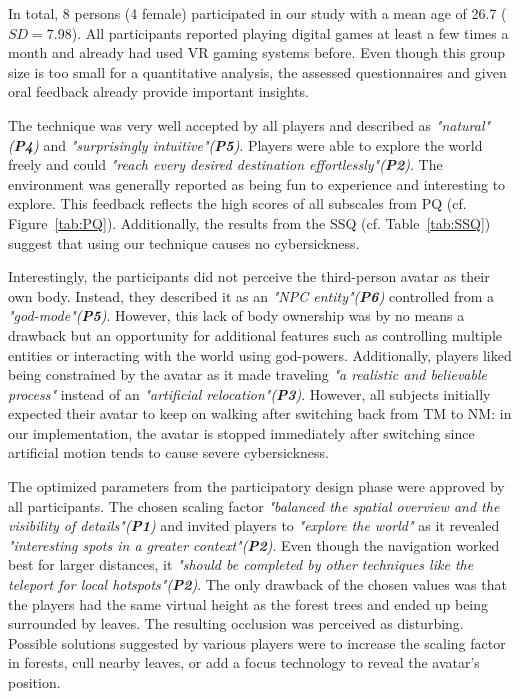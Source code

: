 \documentclass[sigchi-a, authorversion]{acmart}
\newcommand{\comm}[1]{}
\begin{document}
In total, 8 persons (4 female) participated in our study with a mean age of 26.7 ($SD=7.98$). All participants reported playing digital games at least a few times a month and already had used VR gaming systems before. Even though this group size is too small for a quantitative analysis, the assessed questionnaires and given oral feedback already provide important insights.\par
The technique was very well accepted by all players and described as \textit{"natural" (\textbf{P4})} and \textit{"surprisingly intuitive"(\textbf{P5})}. Players were able to explore the world freely and could \textit{"reach every desired destination effortlessly"(\textbf{P2})}. The environment was generally reported as being fun to experience and interesting to explore. This feedback reflects the high scores of all subscales from PQ (cf. Figure~\ref{tab:PQ}). Additionally, the results from the SSQ (cf. Table~\ref{tab:SSQ}) suggest that using our technique causes no cybersickness.\par
Interestingly, the participants did not perceive the third-person avatar as their own body. Instead, they described it as an \textit{"NPC entity"(\textbf{P6})} controlled from a \textit{"god-mode"(\textbf{P5})}. However, this lack of body ownership was by no means a drawback but an opportunity for additional features such as controlling multiple entities or interacting with the world using god-powers. Additionally, players liked being constrained by the avatar as it made traveling \textit{"a realistic and believable process"} instead of an \textit{"artificial relocation"(\textbf{P3})}. However, all subjects initially expected their avatar to keep on walking after switching back from TM to NM: in our implementation, the avatar is stopped immediately after switching since artificial motion tends to cause severe cybersickness.\par
The optimized parameters from the participatory design phase were approved by all participants. The chosen scaling factor \textit{"balanced the spatial overview and the visibility of details"(\textbf{P1})} and invited players to \textit{"explore the world"} as it revealed \textit{"interesting spots in a greater context"(\textbf{P2})}. Even though the navigation worked best for larger distances, it \textit{"should be completed by other techniques like the teleport for local hotspots"(\textbf{P2})}. The only drawback of the chosen values was that the players had the same virtual height as the forest trees and ended up being surrounded by leaves. The resulting occlusion was perceived as disturbing. Possible solutions suggested by various players were to increase the scaling factor in forests, cull nearby leaves, or add a focus technology to reveal the avatar's position.\comm{ Interestingly, two participants preferred to keep the status quo as it forced them to actively evade trees and leaves by real walking in TM which felt \textit{"realistic"(\textbf{P1})}.}\par
\end{document}

